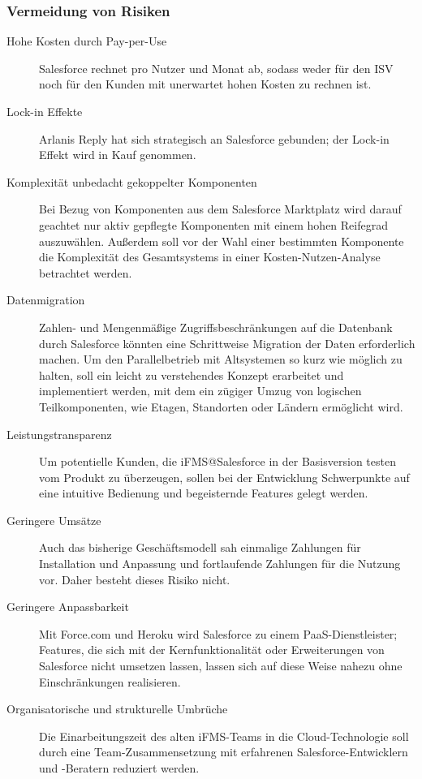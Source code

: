 \subsubsection{Vermeidung von Risiken}
\begin{description}
	\item[Hohe Kosten durch Pay-per-Use] Salesforce rechnet pro Nutzer und 
Monat ab, sodass weder für den ISV noch für den Kunden mit unerwartet 
hohen Kosten zu rechnen ist.
	\item[Lock-in Effekte] Arlanis Reply hat sich strategisch an Salesforce 
gebunden; der Lock-in Effekt wird in Kauf genommen.
	\item[Komplexität unbedacht gekoppelter Komponenten] Bei Bezug 
von Komponenten aus dem Salesforce Marktplatz wird darauf geachtet nur aktiv 
gepflegte Komponenten mit einem hohen Reifegrad auszuwählen. Außerdem soll vor 
der Wahl einer bestimmten Komponente die Komplexität des Gesamtsystems in einer 
Kosten-Nutzen-Analyse betrachtet werden.
	\item[Datenmigration] Zahlen- und Mengenmäßige Zugriffsbeschränkungen 
auf die Datenbank durch Salesforce könnten eine Schrittweise Migration der 
Daten erforderlich machen. Um den Parallelbetrieb mit Altsystemen so kurz wie 
möglich zu halten, soll ein leicht zu verstehendes Konzept erarbeitet und 
implementiert werden, mit dem ein zügiger Umzug von logischen Teilkomponenten, 
wie Etagen, Standorten oder Ländern ermöglicht wird.
	\item[Leistungstransparenz] Um potentielle Kunden, die iFMS@Salesforce 
in der Basisversion testen vom Produkt zu überzeugen, sollen bei der 
Entwicklung Schwerpunkte auf eine intuitive Bedienung und begeisternde Features 
gelegt werden.
	\item[Geringere Umsätze] Auch das bisherige Geschäftsmodell sah 
einmalige Zahlungen für Installation und Anpassung und fortlaufende Zahlungen 
für die Nutzung vor. Daher besteht dieses Risiko nicht. 
	\item[Geringere Anpassbarkeit] Mit Force.com und Heroku wird Salesforce 
zu einem PaaS-Dienstleister; Features, die sich mit der 
Kernfunktionalität oder Erweiterungen von Salesforce nicht umsetzen lassen, 
lassen sich auf diese Weise nahezu ohne Einschränkungen realisieren.
	\item[Organisatorische und strukturelle Umbrüche] Die Einarbeitungszeit 
des alten iFMS-Teams in die Cloud-Technologie soll durch eine 
Team-Zusammensetzung mit erfahrenen Salesforce-Entwicklern und -Beratern 
reduziert werden. \\

\end{description}
